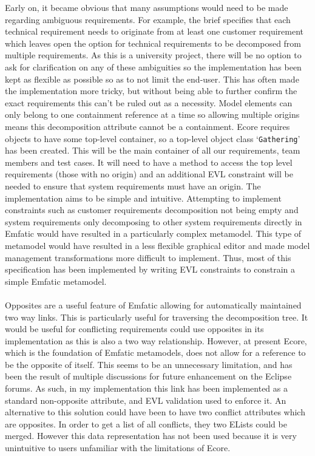 \documentclass{article}
\begin{document}
Early on, it became obvious that many assumptions would need to be made regarding ambiguous requirements. For example, the brief specifies that each technical requirement needs to originate from at least one customer requirement which leaves open the option for technical requirements to be decomposed from multiple requirements. As this is a university project, there will be no option to ask for clarification on any of these ambiguities so the implementation has been kept as flexible as possible so as to not limit the end-user. This has often made the implementation more tricky, but without being able to further confirm the exact requirements this can't be ruled out as a necessity. Model elements can only belong to one containment reference at a time\cite{containment_faq} so allowing multiple origins means this decomposition attribute cannot be a containment. Ecore requires objects to have some top-level container, so a top-level object class `\texttt{Gathering}' has been created. This will be the main container of all our requirements, team members and test cases. It will need to have a method to access the top level requirements (those with no origin) and an additional EVL constraint will be needed to ensure that system requirements must have an origin. The implementation aims to be simple and intuitive. Attempting to implement constraints such as customer requirements decomposition not being empty and system requirements only decomposing to other system requirements directly in Emfatic would have resulted in a particularly complex metamodel. This type of metamodel would have resulted in a less flexible graphical editor and made model management transformations more difficult to implement. Thus, most of this specification has been implemented by writing EVL constraints to constrain a simple Emfatic metamodel.
\\\\
Opposites are a useful feature of Emfatic allowing for automatically maintained two way links. This is particularly useful for traversing the decomposition tree. It would be useful for conflicting requirements could use opposites in its implementation as this is also a two way relationship. However, at present Ecore, which is the foundation of Emfatic metamodels, does not allow for a reference to be the opposite of itself. This seems to be an unnecessary limitation, and has been the result of multiple discussions for future enhancement on the Eclipse forums\cite{opposite_discussion_1, opposite_discussion_2}. As such, in my implementation this link has been implemented as a standard non-opposite attribute, and EVL validation used to enforce it. An alternative to this solution could have been to have two conflict attributes which are opposites. In order to get a list of all conflicts, they two ELists could be merged. However this data representation has not been used because it is very unintuitive to users unfamiliar with the limitations of Ecore.
\end{document}
